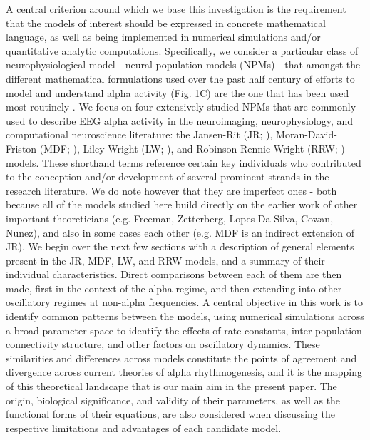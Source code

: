 \documentclass[12pt,twoside]{article}
\begin{document}
A central criterion around which we base this investigation is the requirement that the models of interest should be expressed in concrete mathematical language, as well as being implemented in numerical simulations and/or quantitative analytic computations. Specifically, we consider a particular class of neurophysiological model - neural population models (NPMs) - that amongst the different mathematical formulations used over the past half century of efforts to model and understand alpha activity (Fig. 1C) are the one that has been used most routinely  \citep{da1977cortical,grimbert2006bifurcation,jansen1995electroencephalogram,liley2001spatially,bhattacharya2011thalamo,david2003neural,hartoyo2019parameter,robinson2003neurophysical}. 
We focus on four extensively studied NPMs that are commonly used to describe EEG alpha activity in the neuroimaging, neurophysiology, and computational neuroscience literature: the Jansen-Rit (JR; \citealt{jansen1995electroencephalogram}), Moran-David-Friston (MDF; \citealt{david2003neural, moran2007neural}), Liley-Wright (LW;  \citealt{liley1999continuum, liley2001spatially}), and Robinson-Rennie-Wright (RRW; \citealt{robinson2002dynamics, robinson2003neurophysical}) models. These shorthand terms reference certain key individuals who contributed to the conception and/or development of several prominent strands in the research literature. We do note however that they are imperfect ones - both because all of the models studied here build directly on the earlier work of other important theoreticians (e.g. Freeman, Zetterberg, Lopes Da Silva, Cowan, Nunez), and also in some cases each other (e.g. MDF is an indirect extension of JR). 
We begin over the next few sections with a description of general elements present in the JR, MDF, LW, and RRW models, and a summary of their individual  characteristics. Direct comparisons between each of them are then made, first in the context of the alpha regime, and then extending into other oscillatory regimes at non-alpha frequencies.
A central objective in this work is to identify common patterns between the models, using numerical simulations across a broad parameter space to identify the effects of rate constants, inter-population connectivity structure, and other factors on oscillatory dynamics. These similarities and differences across models constitute the points of agreement and divergence across current theories of alpha rhythmogenesis, and it is the mapping of this theoretical landscape that is our main aim in the present paper. The origin, biological significance, and validity of their parameters, as well as the functional forms of their equations, are also considered when discussing the respective limitations and advantages of each candidate model. 
\end{document}
